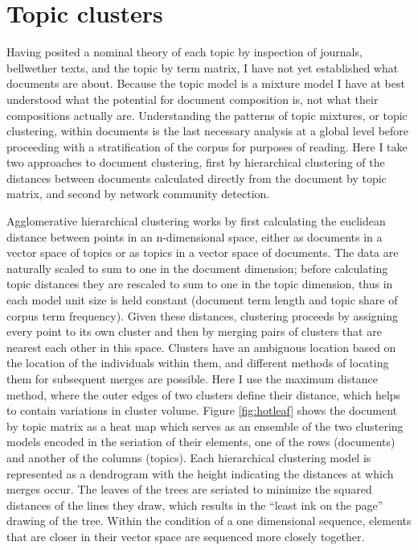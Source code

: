 \documentclass[]{book}
\theoremstyle{definition}
\theoremstyle{definition}
\theoremstyle{definition}
\theoremstyle{remark}
\begin{document}
\hypertarget{topic-clusters}{%
\section{Topic clusters}\label{topic-clusters}}

Having posited a nominal theory of each topic by inspection of journals,
bellwether texts, and the topic by term matrix, I have not yet
established what documents are about. Because the topic model is a
mixture model I have at best understood what the potential for document
composition is, not what their compositions actually are. Understanding
the patterns of topic mixtures, or topic clustering, within documents is
the last necessary analysis at a global level before proceeding with a
stratification of the corpus for purposes of reading. Here I take two
approaches to document clustering, first by hierarchical clustering of
the distances between documents calculated directly from the document by
topic matrix, and second by network community detection.

Agglomerative hierarchical clustering works by first calculating the
euclidean distance between points in an n-dimensional space, either as
documents in a vector space of topics or as topics in a vector space of
documents. The data are naturally scaled to sum to one in the document
dimension; before calculating topic distances they are rescaled to sum
to one in the topic dimension, thus in each model unit size is held
constant (document term length and topic share of corpus term
frequency). Given these distances, clustering proceeds by assigning
every point to its own cluster and then by merging pairs of clusters
that are nearest each other in this space. Clusters have an ambiguous
location based on the location of the individuals within them, and
different methods of locating them for subsequent merges are possible.
Here I use the maximum distance method, where the outer edges of two
clusters define their distance, which helps to contain variations in
cluster volume. Figure \ref{fig:hotleaf} shows the document by topic
matrix as a heat map which serves as an ensemble of the two clustering
models encoded in the seriation of their elements, one of the rows
(documents) and another of the columns (topics). Each hierarchical
clustering model is represented as a dendrogram with the height
indicating the distances at which merges occur. The leaves of the trees
are seriated to minimize the squared distances of the lines they draw,
which results in the ``least ink on the page'' drawing of the tree.
Within the condition of a one dimensional sequence, elements that are
closer in their vector space are sequenced more closely together.
\end{document}

